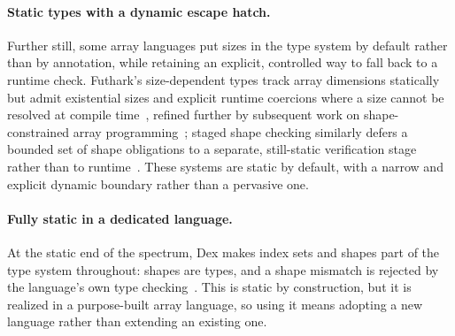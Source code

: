 \documentclass[sigconf,nonacm]{acmart}
\begin{document}
\paragraph{Static types with a dynamic escape hatch.}
Further still, some array languages put sizes in the type system by default
rather than by annotation, while retaining an explicit, controlled way to fall
back to a runtime check. Futhark's size-dependent types track array dimensions
statically but admit existential sizes and explicit runtime coercions where a
size cannot be resolved at compile time~\cite{henriksen2021size}, refined
further by subsequent work on shape-constrained array
programming~\cite{bailly2023shape}; staged shape checking similarly defers a
bounded set of shape obligations to a separate, still-static verification
stage rather than to runtime~\cite{suwa2026staged}. These systems are static by
default, with a narrow and explicit dynamic boundary rather than a pervasive
one.

\paragraph{Fully static in a dedicated language.}
At the static end of the spectrum, Dex makes index sets and shapes part of the
type system throughout: shapes are types, and a shape mismatch is rejected by
the language's own type checking~\cite{paszke2021dex}. This is static by
construction, but it is
realized in a purpose-built array language, so using it means adopting a new
language rather than extending an existing one.
\end{document}
